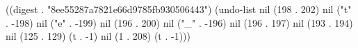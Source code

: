 
((digest . "8ee55287a7821e66d9785fb930506443") (undo-list nil (198 . 202) nil ("t" . -198) nil ("e" . -199) nil (196 . 200) nil ("_" . -196) nil (196 . 197) nil (193 . 194) nil (125 . 129) (t . -1) nil (1 . 208) (t . -1)))
